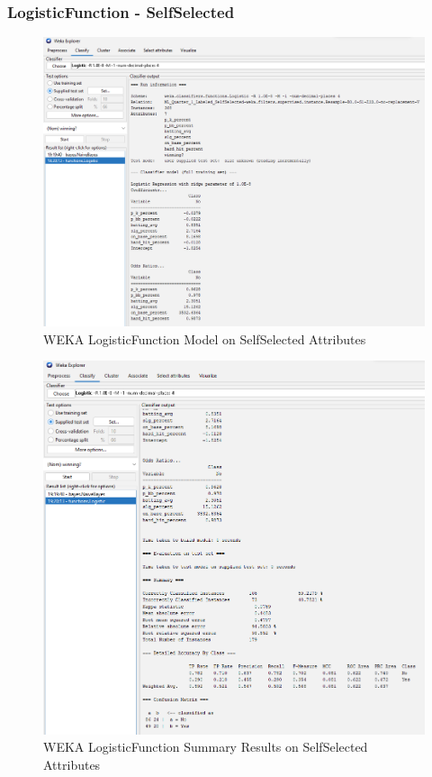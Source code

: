 \documentclass[12pt]{article}
\begin{document}
\subsubsection{LogisticFunction - SelfSelected}
\begin{figure}[h!]
    \includegraphics[scale=0.4]{./images/SelfSelected/LogisticFunction-Model.png}
\centering
    \caption{WEKA LogisticFunction Model on SelfSelected Attributes}
\end{figure}
\newpage
\begin{figure}[h!]
    \includegraphics[scale=0.4]{./images/SelfSelected/LogisticFunction-Summary.png}
\centering
    \caption{WEKA LogisticFunction Summary Results on SelfSelected Attributes}
\end{figure}
\end{document}
